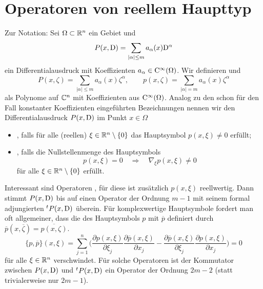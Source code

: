 \chapter{Operatoren von reellem Haupttyp}




Zur Notation: Sei $\Omega\subset\mathbb R^n$ ein Gebiet und 
\begin{equation}
   P(x,\mathrm D) = \sum_{|\alpha|\le m} a_\alpha(x) \mathrm D^\alpha
\end{equation}
ein Differentialausdruck mit Koeffizienten $a_\alpha\in\mathrm C^\infty(\Omega)$. Wir definieren  und 
\begin{equation}
   P(x,\zeta) = \sum_{|\alpha|\le m} a_\alpha(x)\zeta^\alpha,\qquad p(x,\zeta)=\sum_{|\alpha|=m} a_\alpha(x)\zeta^\alpha
\end{equation}
als Polynome auf $\mathbb C^n$ mit Koeffizienten aus $\mathrm C^\infty(\Omega)$. Analog zu den schon für den Fall konstanter Koeffizienten eingeführten Bezeichnungen nennen wir den Differentialausdruck $P(x,\mathrm D)$ im Punkt $x\in\Omega$
\begin{itemize}
\item {}, falls für alle (reellen) $\xi\in\mathbb R^n\setminus\{0\}$ das Hauptsymbol $p(x,\xi)\ne0$ erfüllt;
\item {}, falls die Nullstellenmenge des Hauptsymbols 
\begin{equation}
    p(x,\xi) = 0 \quad \Longrightarrow \quad \nabla_\xi p(x,\xi)\ne0
\end{equation}
für alle $\xi\in\mathbb R^n\setminus\{0\}$ erfüllt.
\end{itemize}
Interessant sind Operatoren , für diese ist zusätzlich $p(x,\xi)$ reellwertig. Dann stimmt $P(x,\mathrm D)$ bis auf einen Operator der Ordnung $m-1$ mit seinem formal adjungierten ${}^t{P}(x,\mathrm D)$ \"uberein. Für komplexwertige Hauptsymbole fordert man oft allgemeiner, dass
die  des Hauptsymbols $p$ mit $\overline p$ definiert durch $\overline p(x, \overline\zeta) = \overline{p(x,\zeta)}$.
\begin{equation}
    \{ p,\overline p\} (x,\xi) = \sum_{j=1}^n \bigg(\frac{\partial p(x,\xi)}{\partial \xi_j} \frac{\partial \overline p (x,\xi)}{\partial x_j} - \frac{\partial \overline p(x,\xi)}{\partial \xi_j}\frac{\partial  p(x,\xi)}{\partial x_j} \bigg)    = 0 
\end{equation}
für alle $\xi\in\mathbb R^n$ verschwindet. Für solche Operatoren ist der Kommutator zwischen $P(x,\mathrm D)$ und ${}^t P(x,\mathrm D)$ ein Operator der Ordnung $2m-2$ (statt trivialerweise nur $2m-1$).


